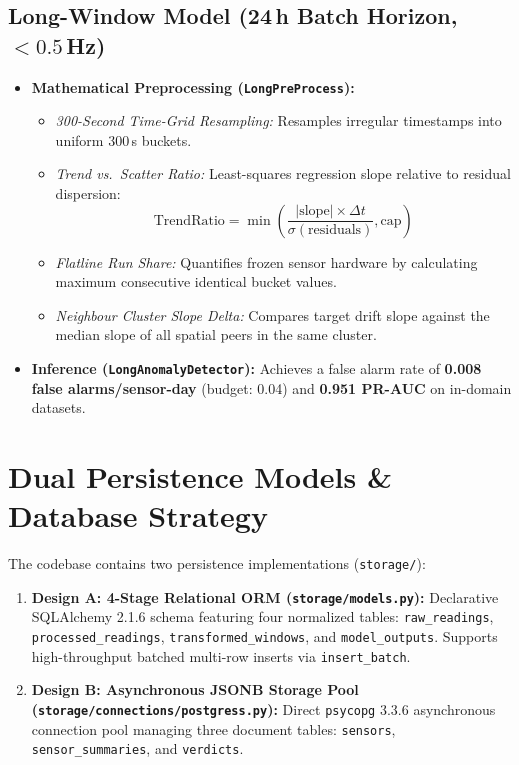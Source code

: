 \documentclass[10pt,a4paper]{report}
\begin{document}
\subsection{Long-Window Model (24\,h Batch Horizon, $< 0.5$\,Hz)}
\begin{itemize}[leftmargin=*]
  \item \textbf{Mathematical Preprocessing (\texttt{LongPreProcess}):}
  \begin{itemize}
    \item \textit{300-Second Time-Grid Resampling:} Resamples irregular timestamps into uniform 300\,s buckets.
    \item \textit{Trend vs.\ Scatter Ratio:} Least-squares regression slope relative to residual dispersion:
    \begin{equation}
      \text{TrendRatio} = \min\left(\frac{|\text{slope}| \times \Delta t}{\sigma(\text{residuals})}, \text{cap}\right)
    \end{equation}
    \item \textit{Flatline Run Share:} Quantifies frozen sensor hardware by calculating maximum consecutive identical bucket values.
    \item \textit{Neighbour Cluster Slope Delta:} Compares target drift slope against the median slope of all spatial peers in the same cluster.
  \end{itemize}
  \item \textbf{Inference (\texttt{LongAnomalyDetector}):} Achieves a false alarm rate of \textbf{0.008 false alarms/sensor-day} (budget: 0.04) and \textbf{0.951 PR-AUC} on in-domain datasets.
\end{itemize}

\section{Dual Persistence Models \& Database Strategy}
The codebase contains two persistence implementations (\texttt{storage/}):
\begin{enumerate}
  \item \textbf{Design A: 4-Stage Relational ORM (\texttt{storage/models.py}):} Declarative SQLAlchemy 2.1.6 schema featuring four normalized tables: \texttt{raw\_readings}, \texttt{processed\_readings}, \texttt{transformed\_windows}, and \texttt{model\_outputs}. Supports high-throughput batched multi-row inserts via \texttt{insert\_batch}.
  \item \textbf{Design B: Asynchronous JSONB Storage Pool (\texttt{storage/connections/postgress.py}):} Direct \texttt{psycopg} 3.3.6 asynchronous connection pool managing three document tables: \texttt{sensors}, \texttt{sensor\_summaries}, and \texttt{verdicts}.
\end{enumerate}
\end{document}
